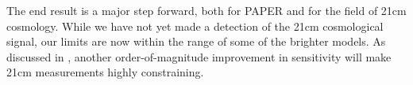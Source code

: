 \documentclass[twocolumn,numberedappendix]{emulateapj} \shorttitle{New Limits on the 21 cm Power Spectrum at $z=8.4$}
\begin{document}
The end result is a major step forward, both for PAPER and for the field of 21cm cosmology.
While we have not yet made a detection of the 21cm cosmological signal, our limits are
now within the range of some of the brighter models.  As discussed in \citet{pober_et_al2015},
another order-of-magnitude improvement in sensitivity will make 21cm measurements highly constraining.



%
%
%
\end{document}
